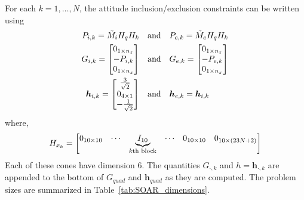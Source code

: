 \documentclass[10pt]{article}
\begin{document}
For each $k=1,\ldots,N$, the attitude inclusion/exclusion constraints can be written using 
\begin{align*}
P_{i,k} = \tilde{M}_i H_q H_k  \quad &\text{and} \quad P_{e,k} = \tilde{M}_e H_q H_k \\
G_{i,k} = \begin{bmatrix}
0_{1 \times n_z} \\ - P_{i,k} \\ 0_{1 \times n_z}
\end{bmatrix} \quad &\text{and} \quad G_{e,k} = \begin{bmatrix}
0_{1 \times n_z} \\ -P_{e,k} \\ 0_{1 \times n_z}
\end{bmatrix} \\
\bm{h}_{i,k} = \begin{bmatrix}
\frac{3}{\sqrt{2}} \\ 0_{4 \times 1} \\ -\frac{1}{\sqrt{2}}
\end{bmatrix} \quad &\text{and} \quad \bm{h}_{e,k} = \bm{h}_{i,k}
\end{align*}
where,
\begin{equation*}
H_{x_k} = \begin{bmatrix}
0_{10 \times 10} & \cdots & \underbrace{I_{10}}_{k\text{th block}} & \cdots & 0_{10 \times 10} & 0_{10 \times (23N+2)} \end{bmatrix}
\end{equation*}
Each of these cones have dimension 6. The quantities $G_{\cdot,k}$ and $h=\bm{h}_{\cdot,k}$ are appended to the bottom of $G_{quad}$ and $\bm{h}_{quad}$ as they are computed. The problem sizes are summarized in Table~\ref{tab:SOAR_dimensions}.
\end{document}
